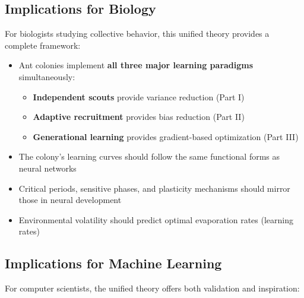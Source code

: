 \documentclass[12pt,letterpaper]{article}
\begin{document}
\subsection{Implications for Biology}

For biologists studying collective behavior, this unified theory provides a complete framework:

\begin{itemize}
    \item Ant colonies implement \textbf{all three major learning paradigms} simultaneously:
    \begin{itemize}
        \item \textbf{Independent scouts} provide variance reduction (Part I)
        \item \textbf{Adaptive recruitment} provides bias reduction (Part II)
        \item \textbf{Generational learning} provides gradient-based optimization (Part III)
    \end{itemize}
    \item The colony's learning curves should follow the same functional forms as neural networks
    \item Critical periods, sensitive phases, and plasticity mechanisms should mirror those in neural development
    \item Environmental volatility should predict optimal evaporation rates (learning rates)
\end{itemize}

\subsection{Implications for Machine Learning}

For computer scientists, the unified theory offers both validation and inspiration:
\end{document}
